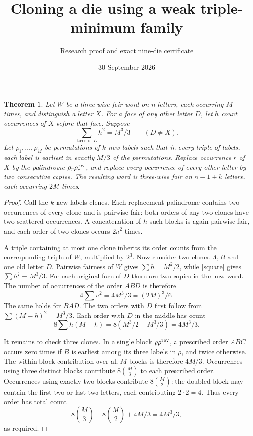 \documentclass[11pt]{article}
\title{Cloning a die using a weak triple-minimum family}
\author{Research proof and exact nine-die certificate}
\date{30 September 2026}
\newtheorem{theorem}{Theorem}
\begin{document}
\maketitle

\begin{theorem}\label{clone}
Let $W$ be a three-wise fair word on $n$ letters, each occurring $M$
times, and distinguish a letter $X$. For a face of any other letter
$D$, let $h$ count occurrences of $X$ before that face. Suppose
\begin{equation}\label{square}
 \sum_{\text{faces of }D}h^2=M^3/3\qquad(D\ne X).
\end{equation}
Let $\rho_1,\ldots,\rho_M$ be permutations of $k$ new labels such
that in every triple of labels, each label is earliest in exactly
$M/3$ of the permutations. Replace occurrence $r$ of $X$ by the
palindrome $\rho_r\rho_r^{\rm rev}$, and replace every occurrence
of every other letter by two consecutive copies. The resulting word
is three-wise fair on $n-1+k$ letters, each occurring $2M$ times.
\end{theorem}
\begin{proof}
Call the $k$ new labels clones. Each replacement palindrome contains
two occurrences of every clone and is pairwise fair: both orders of
any two clones have two scattered occurrences. A concatenation of
$h$ such blocks is again pairwise fair, and each order of two clones
occurs $2h^2$ times.

A triple containing at most one clone inherits its order counts from
the corresponding triple of $W$, multiplied by $2^3$. Now consider
two clones $A,B$ and one old letter $D$. Pairwise fairness of $W$
gives $\sum h=M^2/2$, while \eqref{square} gives $\sum h^2=M^3/3$.
For each original face of $D$ there are two copies in the new word.
The number of occurrences of the order $ABD$ is therefore
\[
 4\sum h^2=4M^3/3=(2M)^3/6.
\]
The same holds for $BAD$. The two orders with $D$ first follow from
$\sum(M-h)^2=M^3/3$. Each order with $D$ in the middle has count
\[
 8\sum h(M-h)=8(M^3/2-M^3/3)=4M^3/3.
\]

It remains to check three clones. In a single block
$\rho\rho^{\rm rev}$, a prescribed order $ABC$ occurs zero times
if $B$ is earliest among its three labels in $\rho$, and twice
otherwise. The within-block contribution over all $M$ blocks is
therefore $4M/3$. Occurrences using three distinct blocks contribute
$8\binom M3$ to each prescribed order. Occurrences using exactly
two blocks contribute $8\binom M2$: the doubled block may contain
the first two or last two letters, each contributing $2\cdot2=4$.
Thus every order has total count
\[
 8\binom M3+8\binom M2+4M/3=4M^3/3,
\]
as required.
\end{proof}
\end{document}

